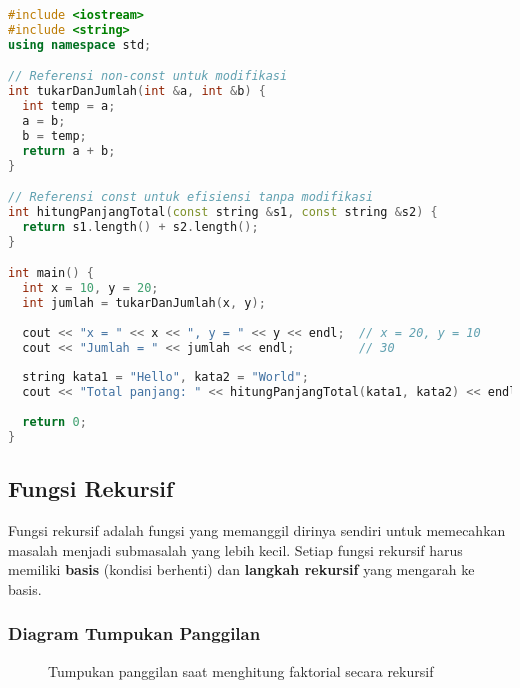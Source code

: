 \documentclass[../main.tex]{subfiles}
\begin{document}
\begin{lstlisting}[language=C++, caption={Pass by reference (C++)}]
#include <iostream>
#include <string>
using namespace std;

// Referensi non-const untuk modifikasi
int tukarDanJumlah(int &a, int &b) {
  int temp = a;
  a = b;
  b = temp;
  return a + b;
}

// Referensi const untuk efisiensi tanpa modifikasi
int hitungPanjangTotal(const string &s1, const string &s2) {
  return s1.length() + s2.length();
}

int main() {
  int x = 10, y = 20;
  int jumlah = tukarDanJumlah(x, y);
  
  cout << "x = " << x << ", y = " << y << endl;  // x = 20, y = 10
  cout << "Jumlah = " << jumlah << endl;         // 30
  
  string kata1 = "Hello", kata2 = "World";
  cout << "Total panjang: " << hitungPanjangTotal(kata1, kata2) << endl;
  
  return 0;
}
\end{lstlisting}

\subsection{Fungsi Rekursif}
Fungsi rekursif adalah fungsi yang memanggil dirinya sendiri untuk memecahkan masalah menjadi submasalah yang lebih kecil. Setiap fungsi rekursif harus memiliki \textbf{basis} (kondisi berhenti) dan \textbf{langkah rekursif} yang mengarah ke basis.

\subsubsection{Diagram Tumpukan Panggilan}
\begin{figure}[H]
  \centering
  \caption{Tumpukan panggilan saat menghitung faktorial secara rekursif}
\end{figure}
\end{document}
